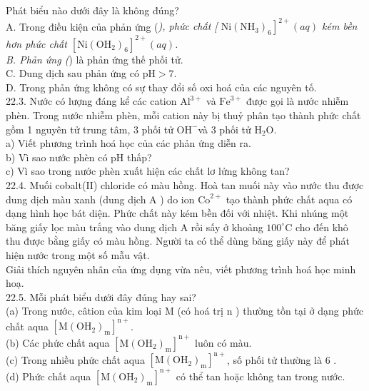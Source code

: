 \documentclass[10pt]{article}
\begin{document}
Phát biểu nào dưới đây là không đúng?\\
A. Trong điều kiện của phản ứng (\textit{), phức chất [ $\left.\mathrm{Ni}\left(\mathrm{NH}_{3}\right)_{6}\right]^{2+}(a q)$ kém bền hơn phức chất $\left[\mathrm{Ni}\left(\mathrm{OH}_{2}\right)_{6}\right]^{2+}(a q)$.\\
B. Phản ứng (}) là phản ứng thế phối tử.\\
C. Dung dịch sau phản ứng có $\mathrm{pH}>7$.\\
D. Trong phản ứng không có sự thay đổi số oxi hoá của các nguyên tố.\\
22.3. Nước có lượng đáng kể các cation $\mathrm{Al}^{3+}$ và $\mathrm{Fe}^{3+}$ được gọi là nước nhiễm phèn. Trong nước nhiễm phèn, mỗi cation này bị thuỷ phân tạo thành phức chất gồm 1 nguyên tử trung tâm, 3 phối tử $\mathrm{OH}^{-}$và 3 phối tử $\mathrm{H}_{2} \mathrm{O}$.\\
a) Viết phương trình hoá học của các phản ứng diễn ra.\\
b) Vì sao nước phèn có pH thấp?\\
c) Vì sao trong nước phèn xuất hiện các chất lơ lửng không tan?\\
22.4. Muối cobalt(II) chloride có màu hồng. Hoà tan muối này vào nước thu được dung dịch màu xanh (dung dịch A ) do ion $\mathrm{Co}^{2+}$ tạo thành phức chất aqua có dạng hình học bát diện. Phức chất này kém bền đối với nhiệt. Khi nhúng một băng giấy lọc màu trắng vào dung dịch A rồi sấy ở khoảng $100^{\circ} \mathrm{C}$ cho đến khô thu được bằng giấy có màu hồng. Người ta có thể dùng băng giấy này để phát hiện nước trong một số mẫu vật.\\
Giải thích nguyên nhân của ứng dụng vừa nêu, viết phương trình hoá học minh hoạ.\\
22.5. Mỗi phát biểu dưới đây đúng hay sai?\\
(a) Trong nước, câtion của kim loại M (có hoá trị n ) thường tồn tại ở dạng phức chất aqua $\left[\mathrm{M}\left(\mathrm{OH}_{2}\right)_{\mathrm{m}}\right]^{\mathrm{n}+}$.\\
(b) Các phức chất aqua $\left[\mathrm{M}\left(\mathrm{OH}_{2}\right)_{\mathrm{m}}\right]^{\mathrm{n}+}$ luôn có màu.\\
(c) Trong nhiều phức chất aqua $\left[\mathrm{M}\left(\mathrm{OH}_{2}\right)_{\mathrm{m}}\right]^{\mathrm{n}+}$, số phối tử thường là 6 .\\
(d) Phức chất aqua $\left[\mathrm{M}\left(\mathrm{OH}_{2}\right)_{\mathrm{m}}\right]^{\mathrm{n}+}$ có thể tan hoặc không tan trong nước.\\
\end{document}
